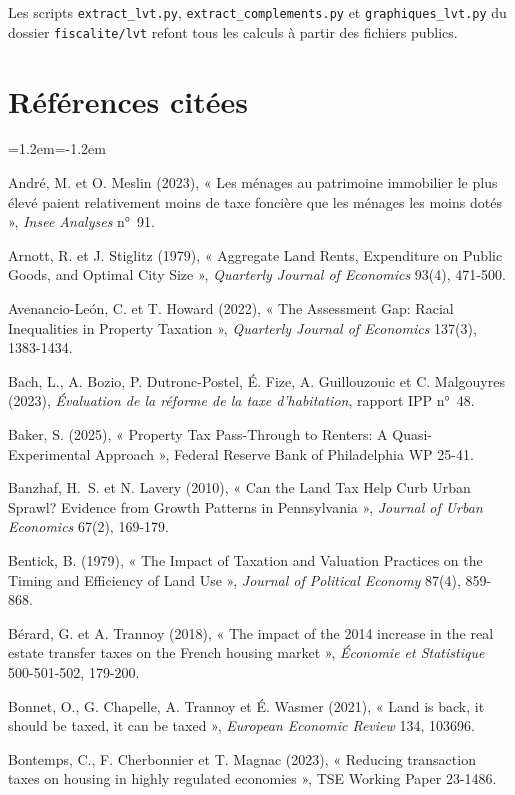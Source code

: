 \documentclass[11pt,a4paper]{article}
\begin{document}
Les scripts \texttt{extract\_lvt.py}, \texttt{extract\_complements.py} et
\texttt{graphiques\_lvt.py} du dossier \texttt{fiscalite/lvt} refont tous les calculs à partir
des fichiers publics.

\section*{Références citées}
\begin{list}{}{\leftmargin=1.2em\itemindent=-1.2em\itemsep=1pt\parsep=0pt}
\item André, M. et O. Meslin (2023), « Les ménages au patrimoine immobilier le plus élevé paient
relativement moins de taxe foncière que les ménages les moins dotés », \emph{Insee Analyses} n°~91.
\item Arnott, R. et J. Stiglitz (1979), « Aggregate Land Rents, Expenditure on Public Goods, and
Optimal City Size », \emph{Quarterly Journal of Economics} 93(4), 471-500.
\item Avenancio-León, C. et T. Howard (2022), « The Assessment Gap: Racial Inequalities in Property
Taxation », \emph{Quarterly Journal of Economics} 137(3), 1383-1434.
\item Bach, L., A. Bozio, P. Dutronc-Postel, É. Fize, A. Guillouzouic et C. Malgouyres (2023),
\emph{Évaluation de la réforme de la taxe d'habitation}, rapport IPP n°~48.
\item Baker, S. (2025), « Property Tax Pass-Through to Renters: A Quasi-Experimental Approach »,
Federal Reserve Bank of Philadelphia WP 25-41.
\item Banzhaf, H.~S. et N. Lavery (2010), « Can the Land Tax Help Curb Urban Sprawl? Evidence from
Growth Patterns in Pennsylvania », \emph{Journal of Urban Economics} 67(2), 169-179.
\item Bentick, B. (1979), « The Impact of Taxation and Valuation Practices on the Timing and
Efficiency of Land Use », \emph{Journal of Political Economy} 87(4), 859-868.
\item Bérard, G. et A. Trannoy (2018), « The impact of the 2014 increase in the real estate transfer
taxes on the French housing market », \emph{Économie et Statistique} 500-501-502, 179-200.
\item Bonnet, O., G. Chapelle, A. Trannoy et É. Wasmer (2021), « Land is back, it should be taxed,
it can be taxed », \emph{European Economic Review} 134, 103696.
\item Bontemps, C., F. Cherbonnier et T. Magnac (2023), « Reducing transaction taxes on housing in
highly regulated economies », TSE Working Paper 23-1486.

\end{list}
\end{document}
